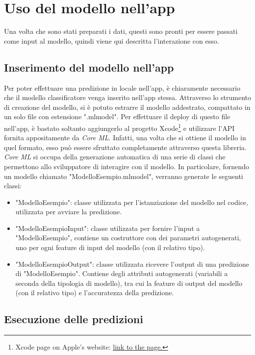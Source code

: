 \section{Uso del modello nell'app}

Una volta che sono stati preparati i dati, questi sono pronti per essere passati
come input al modello, quindi viene qui descritta l'interazione con esso.

\subsection{Inserimento del modello nell'app}

Per poter effettuare una predizione in locale nell'app, è chiaramente necessario che 
il modello classificatore venga inserito nell'app stessa. Attraverso lo strumento di 
creazione del modello, si è potuto estrarre il modello addestrato, compattato in un 
solo file con estensione ".mlmodel". Per effettuare il deploy di questo file nell'app,
è bastato soltanto aggiungerlo al progetto Xcode\footnote{
Xcode page on Apple's website: 
\href{https://developer.apple.com/xcode/}{\underline{link to the page.}}} e utilizzare l'API fornita 
appositamente da \emph{Core ML}. Infatti, una volta che si ottiene il modello in quel
formato, esso può essere sfruttato completamente attraverso questa libreria.
\emph{Core ML} si occupa della generazione automatica di una serie di classi che 
permettono allo sviluppatore di interagire con il modello. In particolare, fornendo
un modello chiamato "ModelloEsempio.mlmodel", verranno generate le seguenti classi:
\begin{itemize}
    \item "ModelloEsempio": classe utilizzata per l'istanziazione del modello nel
    codice, utilizzata per avviare la predizione.
    \item "ModelloEsempioInput": classe utilizzata per fornire l'input a "ModelloEsempio",
    contiene un costruttore con dei parametri autogenerati, uno per ogni feature di
    input del modello (con il relativo tipo).
    \item "ModelloEsempioOutput":  classe utilizzata ricevere l'output di una predizione
    di "ModelloEsempio". Contiene degli attributi autogenerati (variabili a seconda della
    tipologia di modello), tra cui la feature di output del modello (con il relativo tipo)
    e l'accuratezza della predizione.
\end{itemize}

\subsection{Esecuzione delle predizioni}

